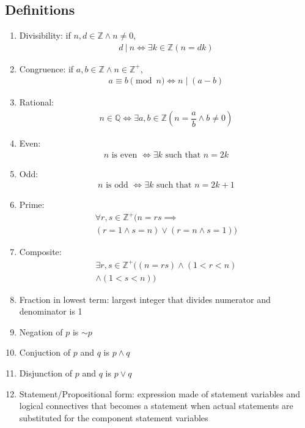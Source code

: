 \documentclass[landscape, a4paper]{article}
\newcommand{\Z}{\mathbb{Z}}
\newcommand{\Q}{\mathbb{Q}}
\newcommand{\Or}{\vee}
\renewcommand{\and}{\wedge}
\newcommand{\customsection}[1]{%
    \vspace*{-16pt}%
    \section*{#1}%
    \vspace*{-5pt}%
}
\begin{document}
\begin{multicols*}{4}
    \customsection{Definitions}
    \begin{enumerate}[wide, labelindent=2pt]
        \item Divisibility: if $n,d\in \Z \and n\neq 0$,
              \begin{align*}
                  d\ |\ n \iff \exists k\in\Z(n=dk)
              \end{align*}
        \item Congruence: if $a,b\in\Z \and n\in\Z^+$,
              \begin{align*}
                  a\equiv b\pmod{n} \iff n\mid (a-b)
              \end{align*}
        \item Rational:
              \begin{align*}
                  n\in\Q \iff \exists a,b\in\Z \left(n=\dfrac{a}{b} \and b \neq 0\right)
              \end{align*}
        \item Even:
              \begin{align*}
                  n \text{ is even } \iff \exists k \text{ such that }n=2k
              \end{align*}
        \item Odd:
              \begin{align*}
                  n \text{ is odd } \iff \exists k \text{ such that }n=2k+1
              \end{align*}
        \item Prime:
              \begin{multline*}
                  \forall r,s\in\Z^+ (n=rs\implies \\ (r=1\and s=n) \Or (r=n \and s=1))
              \end{multline*}
        \item Composite:
              \begin{multline*}
                  \exists r,s\in\Z^+ ((n=rs) \and (1<r<n)\\ \and (1<s<n))
              \end{multline*}
        \item Fraction in lowest term: largest integer that divides numerator and denominator is 1
        \item Negation of $p$ is ${\sim} p$
        \item Conjuction of $p$ and $q$ is $p \and q$
        \item Disjunction of $p$ and $q$ is $p \Or q$
        \item Statement/Propositional form: expression made of statement variables and logical connectives that becomes a statement when actual statements are substituted for the component statement variables

\end{enumerate}
\end{multicols*}
\end{document}
